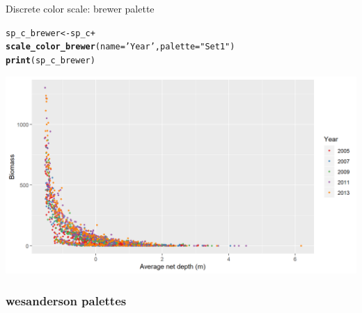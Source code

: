\documentclass{beamer}\usepackage[]{graphicx}\usepackage[]{color}
\makeatletter
\newcommand{\hlstr}[1]{\textcolor[rgb]{0.192,0.494,0.8}{#1}}%
\newcommand{\hlopt}[1]{\textcolor[rgb]{0,0,0}{#1}}%
\newcommand{\hlstd}[1]{\textcolor[rgb]{0.345,0.345,0.345}{#1}}%
\newcommand{\hlkwb}[1]{\textcolor[rgb]{0.69,0.353,0.396}{#1}}%
\newcommand{\hlkwc}[1]{\textcolor[rgb]{0.333,0.667,0.333}{#1}}%
\newcommand{\hlkwd}[1]{\textcolor[rgb]{0.737,0.353,0.396}{\textbf{#1}}}%
\newenvironment{kframe}{%
 \def\at@end@of@kframe{}%
 \ifinner\ifhmode%
  \def\at@end@of@kframe{\end{minipage}}%
  \begin{minipage}{\columnwidth}%
 \fi\fi%
 \def\FrameCommand##1{\hskip\@totalleftmargin \hskip-\fboxsep
 \colorbox{shadecolor}{##1}\hskip-\fboxsep
     \hskip-\linewidth \hskip-\@totalleftmargin \hskip\columnwidth}%
 \MakeFramed {\advance\hsize-\width
   \@totalleftmargin\z@ \linewidth\hsize
   \@setminipage}}%
 {\par\unskip\endMakeFramed%
 \at@end@of@kframe}
\newenvironment{knitrout}{}{} %
\makeatother
\begin{document}
\begin{frame}[fragile]{Discrete color scale: brewer palette}
\begin{knitrout}\footnotesize
{}\color{fgcolor}\begin{kframe}
\begin{alltt}
\hlstd{sp_c_brewer} \hlkwb{<-} \hlstd{sp_c} \hlopt{+}
  \hlkwd{scale_color_brewer}\hlstd{(}\hlkwc{name}\hlstd{=}\hlstr{'Year'}\hlstd{,} \hlkwc{palette}\hlstd{=}\hlstr{"Set1"}\hlstd{)}
\hlkwd{print}\hlstd{(sp_c_brewer)}
\end{alltt}
\end{kframe}

{\centering \includegraphics[width=.9\linewidth]{figure/sp_discrete_color4b-1} 

}



\end{knitrout}
\end{frame}

\subsubsection{wesanderson palettes}
\end{document}
